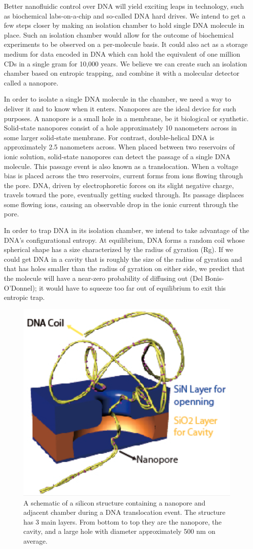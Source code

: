 \documentclass[aps,prl,preprint,groupedaddress]{revtex4}
\begin{document}
Better nanofluidic control over DNA will yield exciting leaps in technology, such as biochemical labs-on-a-chip and so-called DNA hard drives. We intend to get a few steps closer by making an isolation chamber to hold single DNA molecule in place. Such an isolation chamber would allow for the outcome of biochemical experiments to be observed on a per-molecule basis. It could also act as a storage medium for data encoded in DNA which can hold the equivalent of one million CDs in a single gram for 10,000 years\cite{dna-hard-drive}. We believe we can create such an isolation chamber based on entropic trapping, and combine it with a molecular detector called a nanopore.

In order to isolate a single DNA molecule in the chamber, we need a way to deliver it and to know when it enters. Nanopores are the ideal device for such purposes. A nanopore is a small hole in a membrane, be it biological or synthetic. Solid-state nanopores consist of a hole approximately 10 nanometers across in some larger solid-state membrane. For contrast, double-helical DNA is approximately 2.5 nanometers across. When placed between two reservoirs of ionic solution, solid-state nanopores can detect the passage of a single DNA molecule. This passage event is also known as a translocation. When a voltage bias is placed across the two reservoirs, current forms from ions flowing through the pore. DNA, driven by electrophoretic forces on its slight negative charge, travels toward the pore, eventually getting sucked through. Its passage displaces some flowing ions, causing an observable drop in the ionic current through the pore.

In order to trap DNA in its isolation chamber, we intend to take advantage of the DNA’s configurational entropy. At equilibrium, DNA forms a random coil whose spherical shape has a size characterized by the radius of gyration (Rg). If we could get DNA in a cavity that is roughly the size of the radius of gyration and that has holes smaller than the radius of gyration on either side, we predict that the molecule will have a near-zero probability of diffusing out (Del Bonis-O’Donnel); it would have to squeeze too far out of equilibrium to exit this entropic trap.

\begin{figure}
\centering
\includegraphics[width=.4\textwidth]{figures/nanopore-schematic}
\caption{A schematic of a silicon structure containing a nanopore and adjacent chamber during a DNA translocation event. The structure has 3 main layers. From bottom to top they are the nanopore, the cavity, and a large hole with diameter approximately 500 nm on average.}
\label{fig:nanopore-schematic}
\end{figure}
\end{document}
